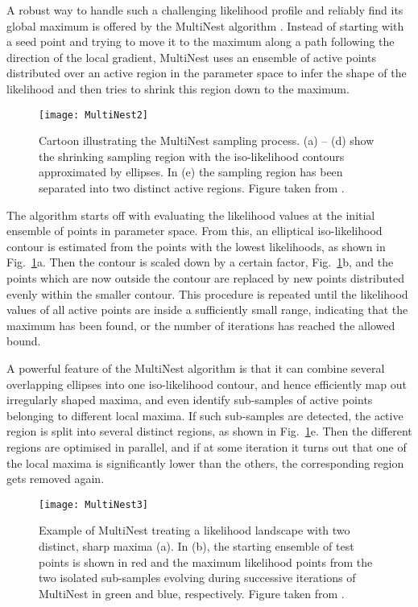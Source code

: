 A robust way to handle such a challenging likelihood profile and reliably find
its global maximum is offered by the MultiNest algorithm \cite{MultiNest1,
MultiNest2}. Instead of starting with a seed point and trying to move it to
the maximum along a path following the direction of the local gradient,
MultiNest uses an ensemble of active points distributed over an active region
in the parameter space to infer the shape of the likelihood and then tries to
shrink this region down to the maximum.

\begin{figure}[ht]
 \centering
 \texttt{[image: MultiNest2]}
\caption{Cartoon illustrating the MultiNest sampling process. (a) -- (d) show
  the shrinking sampling region with the iso-likelihood contours approximated
  by ellipses. In (e) the sampling region has been separated into two  distinct
  active regions. Figure taken from \cite{MultiNest1}.}
\label{fig:MultiNest_process}
\end{figure} 

The algorithm starts off with evaluating the likelihood values at the initial
ensemble of points in parameter space. From this, an elliptical iso-likelihood
contour is estimated from the points with the lowest likelihoods, as shown in
Fig.~\ref{fig:MultiNest_process}a. Then the contour is scaled down by a certain
factor, Fig.~\ref{fig:MultiNest_process}b, and the points which are now outside
the contour are replaced by new points distributed evenly within the smaller
contour. This procedure is repeated until the likelihood values of all active
points are inside a sufficiently small range, indicating that the maximum has
been found, or the number of iterations has reached the allowed bound.

A powerful feature of the MultiNest algorithm is that it can combine several
overlapping ellipses into one iso-likelihood contour, and hence efficiently map
out irregularly shaped maxima, and even identify sub-samples of active points
belonging to different local maxima. If such sub-samples are detected, the
active region is split into several distinct regions, as shown in
Fig.~\ref{fig:MultiNest_process}e. Then the different regions are optimised in
parallel, and if at some iteration it turns out that one of the local maxima is
significantly lower than the others, the corresponding region gets removed
again.

\begin{figure}[ht]
 \centering
 \texttt{[image: MultiNest3]}
\caption{Example of MultiNest treating a likelihood landscape with two
  distinct, sharp maxima (a). In (b), the starting ensemble of test points is
  shown in red and the maximum likelihood points from the two isolated
  sub-samples evolving during successive iterations of MultiNest in green and
  blue, respectively. Figure taken from \cite{MultiNest1}.}
\label{fig:MultiNest_result}
\end{figure}


